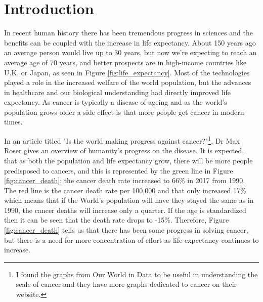 
\section{Introduction}

In recent human history there has been tremendous progress in sciences and the benefits can be coupled with the increase in life expectancy. About 150 years ago an average person would live up to 30 years, but now we're expecting to reach an average age of 70 years, and better prospects are in high-income countries like U.K. or Japan, as seen in Figure \ref{fig:life_expectancy}. Most of the technologies played a role in the increased welfare of the world population, but the advances in healthcare and our biological understanding had directly improved life expectancy. As cancer is typically a disease of ageing and as the world's population grows older a side effect is that more people get cancer in modern times.

In an article titled "Is the world making progress against cancer?"\cite{World_in_Data_undated-gc}\footnote{I found the graphs from Our World in Data to be useful in understanding the scale of cancer and they have more graphs dedicated to cancer on their website\cite{Roser2015-qb}. }, Dr Max Roser gives an overview of humanity's progress on the disease. It is expected, that as both the population and life expectancy grow, there will be more people predisposed to cancers, and this is represented by the green line in Figure \ref{fig:cancer_death}; the cancer death rate increased to 66\% in 2017 from 1990. The red line is the cancer death rate per 100,000 and that only increased 17\% which means that if the World's population will have they stayed the same as in 1990, the cancer deaths will increase only a quarter. If the age is standardized then it can be seen that the death rate drops to -15\%. Therefore, Figure \ref{fig:cancer_death} tells us that there has been some progress in solving cancer, but there is a need for more concentration of effort as life expectancy continues to increase.

